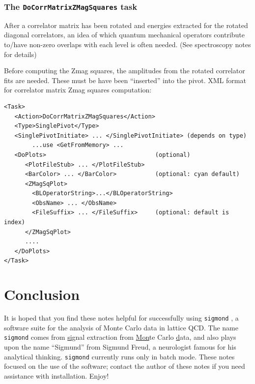 \documentclass[12pt]{article}
\newcommand{\sigmond}{\texttt{sigmond} }
\newcommand{\vb}{\texttt}
\begin{document}
\subsubsection{The \vb{DoCorrMatrixZMagSquares} task}
After a correlator matrix has been rotated and energies extracted for the rotated diagonal correlators,
an idea of which quantum mechanical operators contribute to/have non-zero overlaps with each level is
often needed. (See spectroscopy notes for details)

Before computing the Zmag squares, the amplitudes from the rotated correlator fits are needed.
These must be have been ``inserted'' into the pivot. XML format for correlator matrix Zmag squares computation:

\begin{verbatim}
<Task>
   <Action>DoCorrMatrixZMagSquares</Action>
   <Type>SinglePivot</Type>
   <SinglePivotInitiate> ... </SinglePivotInitiate> (depends on type)
        ...use <GetFromMemory> ...
   <DoPlots>                               (optional)
      <PlotFileStub> ... </PlotFileStub>
      <BarColor> ... </BarColor>           (optional: cyan default)
      <ZMagSqPlot>
        <BLOperatorString>...</BLOperatorString>
        <ObsName> ... </ObsName>
        <FileSuffix> ... </FileSuffix>     (optional: default is index)
      </ZMagSqPlot>
      ....
   </DoPlots>
</Task>
\end{verbatim}

\section{Conclusion}

It is hoped that you find these notes helpful for successfully using
\sigmond, a software suite for the analysis of Monte Carlo data in
lattice QCD.  The name \texttt{sigmond} comes from \underline{sig}nal
extraction from \underline{Mon}te Carlo \underline{d}ata, and also plays
upon the name ``Sigmund'' from Sigmund Freud, a neurologist famous for
his analytical thinking.
\sigmond currently runs only in batch mode.
These notes focused on the use of the software; contact the author
of these notes if you need assistance with installation.
Enjoy!
\end{document}

